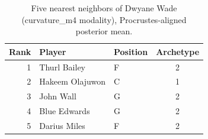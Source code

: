 \begin{table}[htbp]
  \centering\small
  \begin{tabular}{rllc}
    \toprule
    Rank & Player & Position & Archetype \\
    \midrule
    1 & Thurl Bailey & F & 2 \\
    2 & Hakeem Olajuwon & C & 1 \\
    3 & John Wall & G & 2 \\
    4 & Blue Edwards & G & 2 \\
    5 & Darius Miles & F & 2 \\
    \bottomrule
  \end{tabular}
  \caption{Five nearest neighbors of Dwyane Wade (curvature_m4 modality), Procrustes-aligned posterior mean.}
  \label{tab:Dwyane_Wade_neighbors_curvature_m4}
\end{table}

